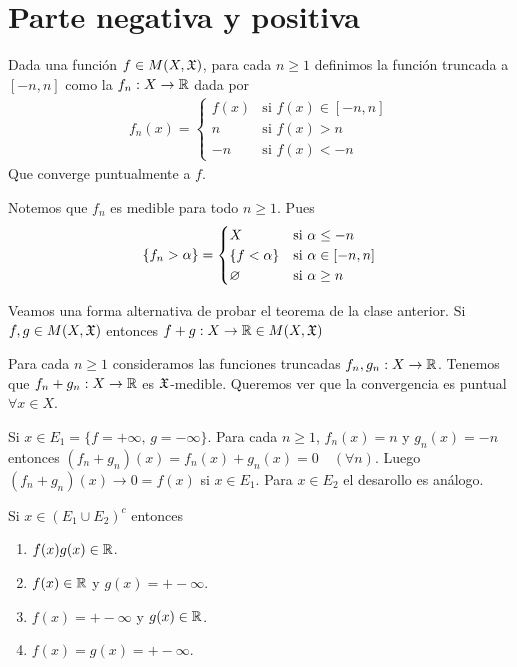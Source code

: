 \section{Parte negativa y positiva}

\begin{definition}
    Dada una función $f \in M(X, \mathfrak{X})$, para cada $n \geq 1$ definimos la función truncada a $[-n ,n]$ como la $f_n : X \to \mathbb{R}$ dada por
    \begin{align*}
        f_n(x) = \begin{cases}
                     f(x) & \text{si } f(x) \in [-n, n] \\
                     n    & \text{si } f(x) > n         \\
                     -n   & \text{si } f(x) < -n
                 \end{cases}
    \end{align*}
    Que converge puntualmente a $f$.
\end{definition}

Notemos que $f_n$ es medible para todo $n \geq 1$. Pues \begin{align*}
    \{ f_n > \alpha \} = \begin{cases}
                             X                & \text{si } \alpha \leq -n     \\
                             \{ f < \alpha \} & \text{si } \alpha \in [-n, n] \\
                             \varnothing        & \text{si } \alpha \geq n
                         \end{cases}
\end{align*}

Veamos una forma alternativa de probar el teorema de la clase anterior.
Si $f, g \in M(X, \mathfrak{X})$ entonces $f + g: X \to \mathbb{R} \in M(X, \mathfrak{X})$

Para cada $n \geq 1$ consideramos las funciones truncadas $f_n, g_n : X \to \mathbb{R}$.
Tenemos que $f_n + g_n : X \to \mathbb{R}$ es $\mathfrak{X}$-medible. Queremos ver que la convergencia es puntual $\forall x \in X$.

Si $x \in E_1 = \{ f = +\infty \text{, } g = -\infty \}$. Para cada $n \geq 1$,
$f_n(x) = n$ y $g_n(x) = -n$ entonces $(f_n + g_n)(x) = f_n(x) + g_n(x) = 0 \quad (\forall n)$.
Luego $(f_n + g_n)(x) \to 0 = f(x)$ si $x \in E_1$. Para $x \in E_2$ el desarollo es análogo.

Si $x \in (E_1 \cup E_2)^c$ entonces \begin{enumerate}
    \item $f(x)g(x) \in \mathbb{R}$.
    \item $f(x) \in \mathbb{R}$ y $g(x) = +-\infty$.
    \item $f(x) = +-\infty$ y $g(x) \in \mathbb{R}$.
    \item $f(x) = g(x) = +-\infty$.
\end{enumerate}

